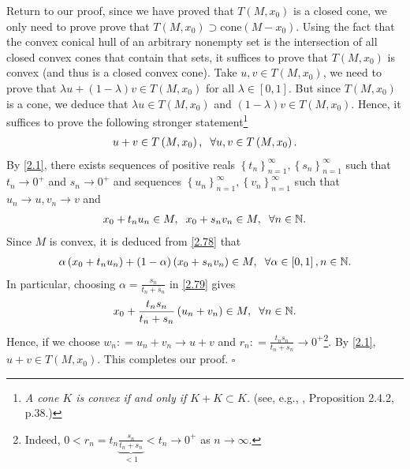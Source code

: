 \documentclass[a4paper]{article}
\numberwithin{equation}{section}
\begin{document}
\begin{enumerate}
Return to our proof, since we have proved that $T\left(M,x_0\right)$ is a closed cone, we only need to prove prove that $T\left( {M,{x_0}} \right) \supset \mbox{cone}\left( {M - {x_0}} \right)$. Using the fact that the convex conical hull of an arbitrary nonempty set is the intersection of all closed convex cones that contain that sets, it suffices to prove that $T\left(M,x_0\right)$ is convex (and thus is a closed convex cone). Take $u,v\in T\left(M,x_0\right)$, we need to prove that $\lambda u + \left( {1 - \lambda } \right)v \in T\left( {M,{x_0}} \right)$ for all $\lambda \in \left[0,1\right]$. But since $T\left(M,x_0\right)$ is a cone, we deduce that $\lambda u \in T\left( {M,{x_0}} \right)$ and $\left( {1 - \lambda } \right)v \in T\left( {M,{x_0}} \right)$. Hence, it suffices to prove the following stronger statement\footnote{\textit{A cone $K$ is convex if and only if $K+K\subset K$.} (see, e.g., \cite{2}, Proposition 2.4.2, p.38.)}
\begin{align}
u + v \in T\left( {M,{x_0}} \right),\hspace{0.2cm} \forall u,v \in T\left( {M,{x_0}} \right).
\end{align}
By \eqref{2.1}, there exists sequences of positive reals $\left\{ {{t_n}} \right\}_{n = 1}^\infty ,\left\{ {{s_n}} \right\}_{n = 1}^\infty $ such that $t_n\to 0^+$ and $s_n\to 0^+$ and sequences $\left\{ {{u_n}} \right\}_{n = 1}^\infty ,\left\{ {{v_n}} \right\}_{n = 1}^\infty $ such that $u_n\to u,v_n\to v$ and
\begin{align}
\label{2.78}
{x_0} + {t_n}{u_n} \in M,\hspace{0.2cm} {x_0} + {s_n}{v_n} \in M ,\hspace{0.2cm} \forall n\in \mathbb{N}.
\end{align}
Since $M$ is convex, it is deduced from \eqref{2.78} that
\begin{align}
\label{2.79}
\alpha \left( {{x_0} + {t_n}{u_n}} \right) + \left( {1 - \alpha } \right)\left( {{x_0} + {s_n}{v_n}} \right) \in M, \hspace{0.2cm} \forall \alpha  \in \left[ {0,1} \right],n\in \mathbb{N}.
\end{align}
In particular, choosing $\alpha  = \frac{{{s_n}}}{{{t_n} + {s_n}}}$ in \eqref{2.79} gives
\begin{align}
{x_0} + \frac{{{t_n}{s_n}}}{{{t_n} + {s_n}}}\left( {{u_n} + {v_n}} \right) \in M, \hspace{0.2cm} \forall n  \in \mathbb{N}.
\end{align}
Hence, if we choose ${w_n}: = {u_n} + {v_n} \to u + v$ and ${r_n}: = \frac{{{t_n}{s_n}}}{{{t_n} + {s_n}}} \to {0^ + }$\footnote{Indeed, $0 < {r_n} = {t_n}\underbrace {\frac{{{s_n}}}{{{t_n} + {s_n}}}}_{ < 1} < {t_n} \to {0^ + }$ as $n\to \infty$.}. By \eqref{2.1}, $u+v \in T\left(M,x_0\right)$. This completes our proof. \hfill $\square$\\

\end{enumerate}
\end{document}

